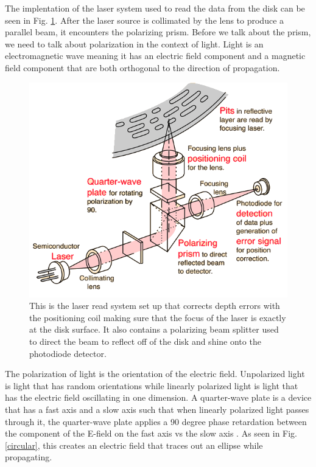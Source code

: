 \documentclass[ notitlepage, numerical, 11pt]{revtex4-1} %
\begin{document}
The implentation of the laser system used to read the data from the disk can be seen in Fig. \ref{cdPlay}. After the laser source is collimated by the lens to produce a parallel beam, it encounters the polarizing prism. Before we talk about the prism, we need to talk about polarization in the context of light. Light is an electromagnetic wave meaning it has an electric field component and a magnetic field component that are both orthogonal to the direction of propagation. 
\begin{figure}[H]
\centerline{\includegraphics[scale=.8]{cdPlay.png}}
\caption{This is the laser read system set up that corrects depth errors with the positioning coil making sure that the focus of the laser is exactly at the disk surface. It also contains a polarizing beam splitter used to direct the beam to reflect off of the disk and shine onto the photodiode detector\cite{hyper}.}
\label{cdPlay}
\end{figure} 
The polarization of light is the orientation of the electric field. Unpolarized light is light that has random orientations while linearly polarized light is light that has the electric field oscillating in one dimension. A quarter-wave plate is a device that has a fast axis and a slow axis such that when linearly polarized light passes through it, the quarter-wave plate applies a 90 degree phase retardation between the component of the E-field on the fast axis vs the slow axis \cite{optics}. As seen in Fig. \ref{circular}, this creates an electric field that traces out an ellipse while propagating.
\end{document}
